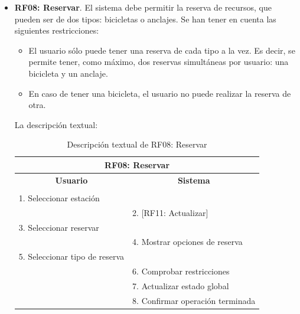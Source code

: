 \begin{itemize}
	\FloatBarrier
	\item \textbf{RF08: Reservar}. El sistema debe permitir la reserva de recursos, que pueden ser de dos tipos: bicicletas o anclajes. Se han tener en cuenta las siguientes restricciones:
	\begin{itemize}
		\item El usuario sólo puede tener una reserva de cada tipo a la vez. Es decir, se permite tener, como máximo, dos reservas simultáneas por usuario: una bicicleta y un anclaje.
		\item En caso de tener una bicicleta, el usuario no puede realizar la reserva de otra.
	\end{itemize}
	
	La descripción textual:
	\begin{table}[h]
		\centering	
		\begin{tabular}{|l|l|}
			\hline
			\multicolumn{2}{|c|}{\textbf{RF08: Reservar}} \\ \hline
			\multicolumn{1}{|c|}{\textbf{Usuario}} & \multicolumn{1}{c|}{\textbf{Sistema}} \\ \hline
			[Pto. inclusión: RF02: Loguear usuario] &\\ \hline
			1. Seleccionar estación &\\ \hline
			& 2. [RF11: Actualizar] \\ \hline
			3. Seleccionar reservar &\\ \hline
			& 4. Mostrar opciones de reserva \\ \hline
			5. Seleccionar tipo de reserva &\\ \hline
			& 6. Comprobar restricciones \\ \hline
			& 7. Actualizar estado global \\ \hline
			& 8. Confirmar operación terminada \\ \hline 
		\end{tabular}
		\caption{Descripción textual de RF08: Reservar}
		\label{tab:tablaDescTextualRF08}
	\end{table}
	

\end{itemize}

